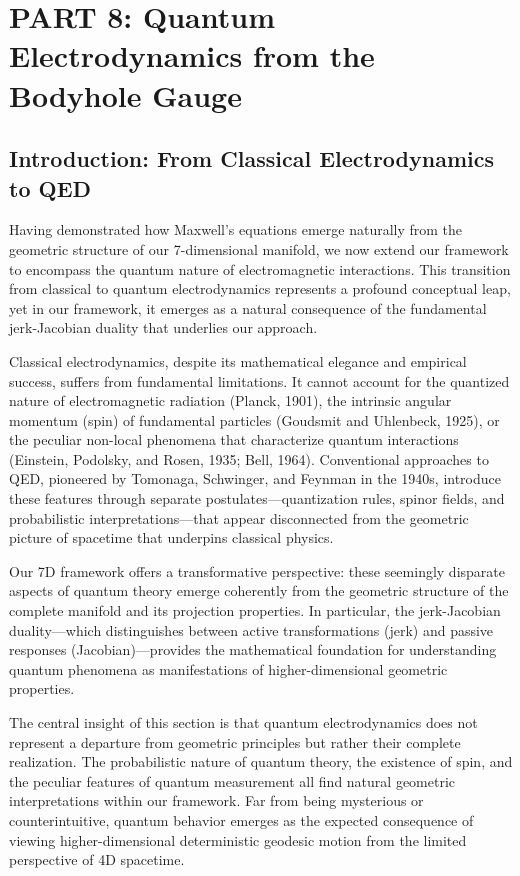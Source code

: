\documentclass{article}
\begin{document}
\section{PART 8: Quantum Electrodynamics from the Bodyhole Gauge}

\subsection{Introduction: From Classical Electrodynamics to QED}

Having demonstrated how Maxwell's equations emerge naturally from the geometric structure of our 7-dimensional manifold, we now extend our framework to encompass the quantum nature of electromagnetic interactions. This transition from classical to quantum electrodynamics represents a profound conceptual leap, yet in our framework, it emerges as a natural consequence of the fundamental jerk-Jacobian duality that underlies our approach.

Classical electrodynamics, despite its mathematical elegance and empirical success, suffers from fundamental limitations. It cannot account for the quantized nature of electromagnetic radiation (Planck, 1901), the intrinsic angular momentum (spin) of fundamental particles (Goudsmit and Uhlenbeck, 1925), or the peculiar non-local phenomena that characterize quantum interactions (Einstein, Podolsky, and Rosen, 1935; Bell, 1964). Conventional approaches to QED, pioneered by Tomonaga, Schwinger, and Feynman in the 1940s, introduce these features through separate postulates—quantization rules, spinor fields, and probabilistic interpretations—that appear disconnected from the geometric picture of spacetime that underpins classical physics.

Our 7D framework offers a transformative perspective: these seemingly disparate aspects of quantum theory emerge coherently from the geometric structure of the complete manifold and its projection properties. In particular, the jerk-Jacobian duality—which distinguishes between active transformations (jerk) and passive responses (Jacobian)—provides the mathematical foundation for understanding quantum phenomena as manifestations of higher-dimensional geometric properties.

The central insight of this section is that quantum electrodynamics does not represent a departure from geometric principles but rather their complete realization. The probabilistic nature of quantum theory, the existence of spin, and the peculiar features of quantum measurement all find natural geometric interpretations within our framework. Far from being mysterious or counterintuitive, quantum behavior emerges as the expected consequence of viewing higher-dimensional deterministic geodesic motion from the limited perspective of 4D spacetime.
\end{document}
